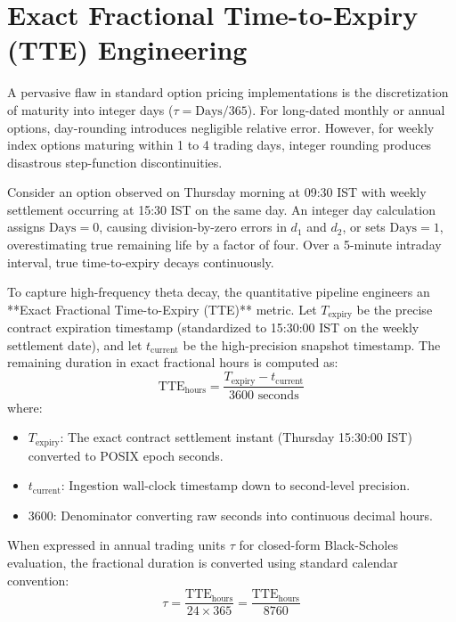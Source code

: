\section{Exact Fractional Time-to-Expiry (TTE) Engineering}
\label{sec:exact_tte}

A pervasive flaw in standard option pricing implementations is the discretization of maturity into integer days ($\tau = \text{Days} / 365$). For long-dated monthly or annual options, day-rounding introduces negligible relative error. However, for weekly index options maturing within 1 to 4 trading days, integer rounding produces disastrous step-function discontinuities.

Consider an option observed on Thursday morning at 09:30 IST with weekly settlement occurring at 15:30 IST on the same day. An integer day calculation assigns $\text{Days} = 0$, causing division-by-zero errors in $d_1$ and $d_2$, or sets $\text{Days} = 1$, overestimating true remaining life by a factor of four. Over a 5-minute intraday interval, true time-to-expiry decays continuously.

To capture high-frequency theta decay, the quantitative pipeline engineers an **Exact Fractional Time-to-Expiry (TTE)** metric. Let $T_{\text{expiry}}$ be the precise contract expiration timestamp (standardized to 15:30:00 IST on the weekly settlement date), and let $t_{\text{current}}$ be the high-precision snapshot timestamp. The remaining duration in exact fractional hours is computed as:
\begin{equation}
    \text{TTE}_{\text{hours}} = \frac{T_{\text{expiry}} - t_{\text{current}}}{3600 \text{ seconds}}
    \label{eq:tte_hours}
\end{equation}
where:
\begin{itemize}
    \item $T_{\text{expiry}}$: The exact contract settlement instant (Thursday 15:30:00 IST) converted to POSIX epoch seconds.
    \item $t_{\text{current}}$: Ingestion wall-clock timestamp down to second-level precision.
    \item $3600$: Denominator converting raw seconds into continuous decimal hours.
\end{itemize}

When expressed in annual trading units $\tau$ for closed-form Black-Scholes evaluation, the fractional duration is converted using standard calendar convention:
\begin{equation}
    \tau = \frac{\text{TTE}_{\text{hours}}}{24 \times 365} = \frac{\text{TTE}_{\text{hours}}}{8760}
    \label{eq:tau_annual}
\end{equation}

